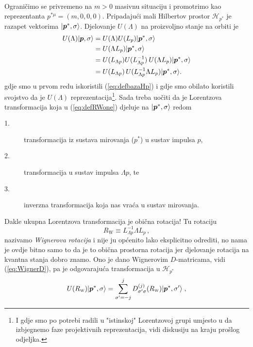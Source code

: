 Ograničimo se privremeno na $m > 0$ masivnu situaciju i promotrimo
kao reprezentanta $p^{*\mu} = (m, 0, 0, 0)$.
Pripadajući mali Hilbertov prostor $\mathcal{H}_{p^*}$ je razapet
vektorima $\ket{\vec{p}^{*}, \sigma}$. Djelovanje $U(\Lambda)$ na
proizvoljno stanje na orbiti je
\begin{align}
    U(\Lambda)\ket{\vec{p}, \sigma} &=  U(\Lambda) U(L_p) \ket{\vec{p}^{*}, \sigma} \\
     &= U(\Lambda L_p) \ket{\vec{p}^{*}, \sigma} \\
     &= U(L_{\Lambda p}) U(L_{\Lambda p}^{-1}) \: U(\Lambda L_p) \ket{\vec{p}^{*}, \sigma} \\
     &= U(L_{\Lambda p})\, U(L_{\Lambda p}^{-1} \Lambda L_p) \ket{\vec{p}^{*}, \sigma}
     \label{eq:defRWone}
.\end{align}
gdje smo u prvom redu iskoristili (\ref{eq:defbazaHp}) i gdje smo
obilato koristili svojstvo da je $U(\Lambda)$ reprezentacija\footnote{I gdje
smo po potrebi radili u "istinskoj" Lorentzovoj grupi 
umjesto u  da izbjegnemo faze projektivnih reprezentacija,
vidi diskusiju na kraju prošlog odjeljka.}.
Sada treba uočiti da je Lorentzova transformacija koja
u (\ref{eq:defRWone}) djeluje na $\ket{\vec{p}^{*}, \sigma}$ redom
\begin{description}
    \item[1.] transformacija iz sustava mirovanja ($p^*$) u sustav impulsa $p$,
    \item[2.] transformacija u sustav impulsa $\Lambda p$, te
    \item[3.] inverzna transformacija koja nas vraća u sustav mirovanja.
\end{description}
Dakle ukupna Lorentzova transformacija je obična rotacija!
Tu rotaciju
\begin{equation}
    R_{\scriptscriptstyle \mathrm{W}} \equiv L_{\Lambda p}^{-1} \Lambda L_p \,,
    \label{eq:defRW}
\end{equation}
nazivamo \emph{Wignerova rotacija}  i nije ju općenito lako eksplicitno
odrediti, no nama je ovdje bitno samo to da je to obična prostorna rotacija
jer djelovanje rotacija na kvantna stanja dobro
znamo. Ono je dano Wignerovim $D$-matricama,
vidi (\ref{eq:WignerD}), pa je odgovarajuća transformacija u $\mathcal{H}_{p^*}$
\begin{equation}
    U(R_{\scriptscriptstyle\rm W}) \ket{\vec{p}^{*}, \sigma} = 
      \sum_{\sigma'=-j}^{j} D^{(j)}_{\sigma'\sigma}(R_{\scriptscriptstyle\rm W})
      \ket{\vec{p}^{*}, \sigma'} \;,
\end{equation}

